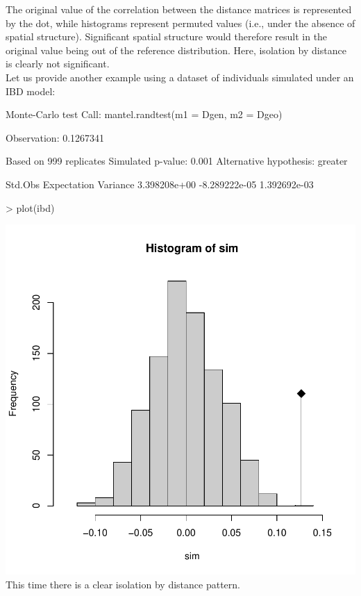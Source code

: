\documentclass{article}
\begin{document}
\noindent The original value of the correlation between the distance matrices is represented by the
dot, while histograms represent permuted values (i.e., under the absence of spatial structure).
Significant spatial structure would therefore result in the original value being out of the
reference distribution.
Here, isolation by distance is clearly not significant.
\\


Let us provide another example using a dataset of individuals simulated under an IBD model:
\begin{Schunk}
\begin{Soutput}
Monte-Carlo test
Call: mantel.randtest(m1 = Dgen, m2 = Dgeo)

Observation: 0.1267341 

Based on 999 replicates
Simulated p-value: 0.001 
Alternative hypothesis: greater 

      Std.Obs   Expectation      Variance 
 3.398208e+00 -8.289222e-05  1.392692e-03 
\end{Soutput}
\end{Schunk}
\begin{Schunk}
\begin{Sinput}
> plot(ibd)
\end{Sinput}
\end{Schunk}
\includegraphics{figs/base-082}
This time there is a clear isolation by distance pattern.
\end{document}
